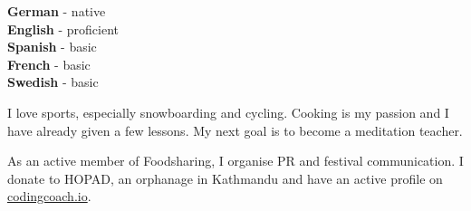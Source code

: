 \documentclass[9pt]{developercv} %
\begin{document}

\begin{minipage}[t]{0.3\textwidth}
	\vspace{-\baselineskip} %

	
	\textbf{German} - native\\
	\textbf{English} - proficient\\
	\textbf{Spanish} - basic\\
	\textbf{French} - basic\\
	\textbf{Swedish} - basic
\end{minipage}
\hfill
\begin{minipage}[t]{0.3\textwidth}
	\vspace{-\baselineskip} %
	
	
  I love sports, especially snowboarding and cycling.
  Cooking is my passion and I have already given a few lessons.
  My next goal is to become a meditation teacher.
\end{minipage}
\hfill
\begin{minipage}[t]{0.3\textwidth}
	\vspace{-\baselineskip} %
	
  
  As an active member of Foodsharing, I organise PR and festival communication.
  I donate to HOPAD, an orphanage in Kathmandu
  and have an active profile on \href{https://mentors.codingcoach.io/}{codingcoach.io}.
\end{minipage}



\end{document}
